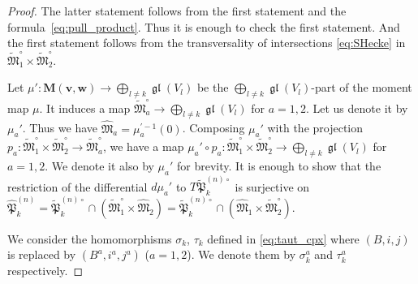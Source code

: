 \documentclass[12pt]{amsart}
\def\frak{\mathfrak}
\theoremstyle{definition}
\theoremstyle{remark}
\numberwithin{equation}{subsection}
\newcommand{\gl}{\operatorname{\frak{gl}}}
\newcommand{\vin}{\operatorname{in}} %
\newcommand{\bM}{{\mathbf M}} %
\newcommand{\M}{{\frak M}} %
\newcommand{\bv}{{\mathbf v}} %
\newcommand{\bw}{{\mathbf w}} %
\newcommand{\Pa}{{\frak P}} %
\newcommand{\Mp}{\widetilde\M}
\newcommand{\Mpp}{\widehat\M}
\begin{document}
\begin{proof}
The latter statement follows from the first statement and the
formula~\eqref{eq:pull_product}. Thus it is enough to check the first
statement. And the first statement follows from the transversality of
intersections \eqref{eq:SHecke} in $\Mp^\circ_1\times\Mp^\circ_2$.

Let $\mu'\colon \bM(\bv,\bw)\to \bigoplus_{l\neq k}\gl(V_l)$ be the
$\bigoplus_{l\neq k}\gl(V_l)$-part of the moment map $\mu$.
It induces a map
$\Mp^\circ_a\to \bigoplus_{l\neq k}\gl(V_l)$ for $a=1, 2$. Let us
denote it by $\mu_a'$. Thus we have $\Mpp_a = \mu_a^{\prime-1}(0)$.
Composing $\mu_a'$ with the projection 
$p_a\colon\Mp^\circ_1\times\Mp^\circ_2\to \Mp^\circ_a$, we have
a map $\mu_a'\circ p_a\colon \Mp^\circ_1\times\Mp^\circ_2\to
\bigoplus_{l\neq k}\gl(V_l)$ for $a=1,2$. We denote it also by
$\mu_a'$ for brevity.
It is enough to show that
the restriction of the differential $d\mu_a'$ to
$T\widetilde\Pa_k^{(n)\circ}$ is surjective on
$\widehat\Pa_k^{(n)} =
\widetilde\Pa_k^{(n)\circ}\cap(\Mp^\circ_1\times\Mpp_2) =
\widetilde\Pa_k^{(n)\circ}\cap(\Mpp_1\times\Mp^\circ_2)$. 

We consider the homomorphisms $\sigma_k$, $\tau_k$ defined in
\eqref{eq:taut_cpx} where $(B,i,j)$ is replaced by $(B^a,i^a,j^a)$
($a=1,2$). We denote them by $\sigma^a_k$ and $\tau^a_k$ respectively.


\end{proof}
\end{document}
